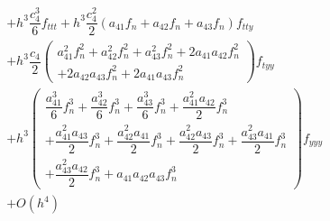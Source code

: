 \documentclass[a4paper,oneside]{book}
\numberwithin{equation}{chapter}
\begin{document}
\begin{align}
 &+ {h^3}\dfrac{{c_4^3}}{6}{f_{ttt}} + {h^3}\dfrac{{c_4^2}}{2}\left( {{a_{41}}{f_n} + {a_{42}}{f_n} + {a_{43}}{f_n}} \right){f_{tty}}\\
 &  + {h^3}\dfrac{{{c_4}}}{2}\left( \begin{array}{l}
a_{41}^2f_n^2 + a_{42}^2f_n^2 + a_{43}^2f_n^2 + 2{a_{41}}{a_{42}}f_n^2\\
 + 2{a_{42}}{a_{43}}f_n^2 + 2{a_{41}}{a_{43}}f_n^2
\end{array} \right){f_{tyy}}
 \\
&+ {h^3}\left( {\begin{array}{*{20}{l}}
{\dfrac{{a_{41}^3}}{6}f_n^3 + \dfrac{{a_{42}^3}}{6}f_n^3 + \dfrac{{a_{43}^3}}{6}f_n^3 + \dfrac{{a_{41}^2{a_{42}}}}{2}f_n^3}\\
{ + \dfrac{{a_{41}^2{a_{43}}}}{2}f_n^3 + \dfrac{{a_{42}^2{a_{41}}}}{2}f_n^3+ \dfrac{{a_{42}^2{a_{43}}}}{2}f_n^3 + \dfrac{{a_{43}^2{a_{41}}}}{2}f_n^3 } \\
{+ \dfrac{{a_{43}^2{a_{42}}}}{2}f_n^3 + {a_{41}}{a_{42}}{a_{43}}f_n^3}
\end{array}} \right){f_{yyy}}\\
 &+ O\left( {{h^4}} \right)
\end{align}
\end{document}
